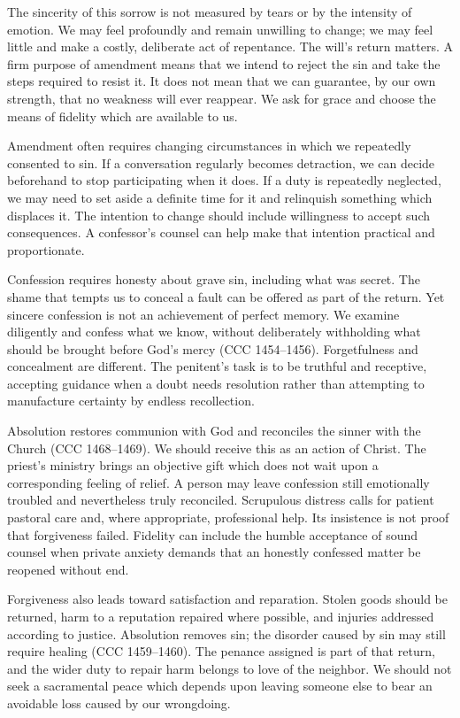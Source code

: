The sincerity of this sorrow is not measured by tears or by the intensity of emotion. We may feel profoundly and remain unwilling to change; we may feel little and make a costly, deliberate act of repentance. The will's return matters. A firm purpose of amendment means that we intend to reject the sin and take the steps required to resist it. It does not mean that we can guarantee, by our own strength, that no weakness will ever reappear. We ask for grace and choose the means of fidelity which are available to us.

Amendment often requires changing circumstances in which we repeatedly consented to sin. If a conversation regularly becomes detraction, we can decide beforehand to stop participating when it does. If a duty is repeatedly neglected, we may need to set aside a definite time for it and relinquish something which displaces it. The intention to change should include willingness to accept such consequences. A confessor's counsel can help make that intention practical and proportionate.

Confession requires honesty about grave sin, including what was secret. The shame that tempts us to conceal a fault can be offered as part of the return. Yet sincere confession is not an achievement of perfect memory. We examine diligently and confess what we know, without deliberately withholding what should be brought before God's mercy (CCC 1454--1456). Forgetfulness and concealment are different. The penitent's task is to be truthful and receptive, accepting guidance when a doubt needs resolution rather than attempting to manufacture certainty by endless recollection.

Absolution restores communion with God and reconciles the sinner with the Church (CCC 1468--1469). We should receive this as an action of Christ. The priest's ministry brings an objective gift which does not wait upon a corresponding feeling of relief. A person may leave confession still emotionally troubled and nevertheless truly reconciled. Scrupulous distress calls for patient pastoral care and, where appropriate, professional help. Its insistence is not proof that forgiveness failed. Fidelity can include the humble acceptance of sound counsel when private anxiety demands that an honestly confessed matter be reopened without end.

Forgiveness also leads toward satisfaction and reparation. Stolen goods should be returned, harm to a reputation repaired where possible, and injuries addressed according to justice. Absolution removes sin; the disorder caused by sin may still require healing (CCC 1459--1460). The penance assigned is part of that return, and the wider duty to repair harm belongs to love of the neighbor. We should not seek a sacramental peace which depends upon leaving someone else to bear an avoidable loss caused by our wrongdoing.

